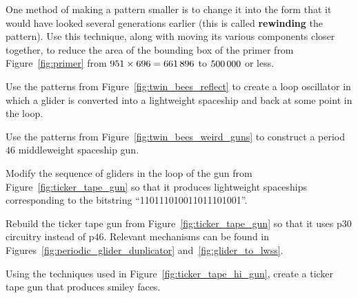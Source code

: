 \begin{multicols}{2}
	\mfilbreak
	
	
	\begin{problem}\label{exer:rewind_primer} 
		One method of making a pattern smaller is to change it into the form that it would have looked several generations earlier (this is called \textbf{rewinding} the pattern). Use this technique, along with moving its various components closer together, to reduce the area of the bounding box of the primer from Figure~\ref{fig:primer} from $951 \times 696 = 661{\,}896$ to $500{\,}000$ or less.
	\end{problem}
	
	
	\mfilbreak
	
	
	\begin{problem}\label{exer:twin_bees_loop} 
		Use the patterns from Figure~\ref{fig:twin_bees_reflect} to create a loop oscillator in which a glider is converted into a lightweight spaceship and back at some point in the loop.
	\end{problem}
	
	
	\mfilbreak
	
	
	\begin{problem}\label{exer:twin_bees_mwss_gun} 
		Use the patterns from Figure~\ref{fig:twin_bees_weird_guns} to construct a period~$46$ middleweight spaceship gun.
	\end{problem}
	
	
	\mfilbreak
	
	
	\begin{problem}\label{exer:ticker_tape_gun_store_different} 
		Modify the sequence of gliders in the loop of the gun from Figure~\ref{fig:ticker_tape_gun} so that it produces lightweight spaceships corresponding to the bitstring ``110111010011011101001''.
	\end{problem}


	\mfilbreak
	
	
	\begin{problem}\label{exer:p30_ticker_tape_gun} 
		Rebuild the ticker tape gun from Figure~\ref{fig:ticker_tape_gun} so that it uses p$30$ circuitry instead of p$46$. Relevant mechanisms can be found in Figures~\ref{fig:periodic_glider_duplicator} and~\ref{fig:glider_to_lwss}.
	\end{problem}
	
	
	\mfilbreak
	
	
	\begin{problem}\label{exer:ticker_tape_smiley_gun} 
		Using the techniques used in Figure~\ref{fig:ticker_tape_hi_gun}, create a ticker tape gun that produces smiley faces.
	\end{problem}
	

\end{multicols}
